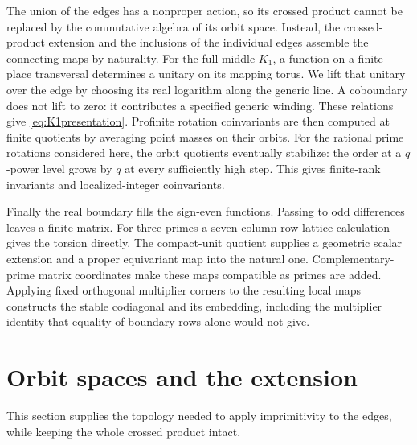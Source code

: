 \documentclass[11pt]{article}
\theoremstyle{definition}
\theoremstyle{remark}
\begin{document}
The union of the edges has a nonproper action, so its crossed product cannot be replaced by the commutative algebra of its orbit space. Instead, the crossed-product extension and the inclusions of the individual edges assemble the connecting maps by naturality. For the full middle $K_1$, a function on a finite-place transversal determines a unitary on its mapping torus. We lift that unitary over the edge by choosing its real logarithm along the generic line. A coboundary does not lift to zero: it contributes a specified generic winding. These relations give \eqref{eq:K1presentation}. Profinite rotation coinvariants are then computed at finite quotients by averaging point masses on their orbits. For the rational prime rotations considered here, the orbit quotients eventually stabilize: the order at a $q$-power level grows by $q$ at every sufficiently high step. This gives finite-rank invariants and localized-integer coinvariants.

Finally the real boundary fills the sign-even functions. Passing to odd differences leaves a finite matrix. For three primes a seven-column row-lattice calculation gives the torsion directly. The compact-unit quotient supplies a geometric scalar extension and a proper equivariant map into the natural one. Complementary-prime matrix coordinates make these maps compatible as primes are added. Applying fixed orthogonal multiplier corners to the resulting local maps constructs the stable codiagonal and its embedding, including the multiplier identity that equality of boundary rows alone would not give.

\section{Orbit spaces and the extension}

This section supplies the topology needed to apply imprimitivity to the edges, while keeping the whole crossed product intact.
\end{document}
